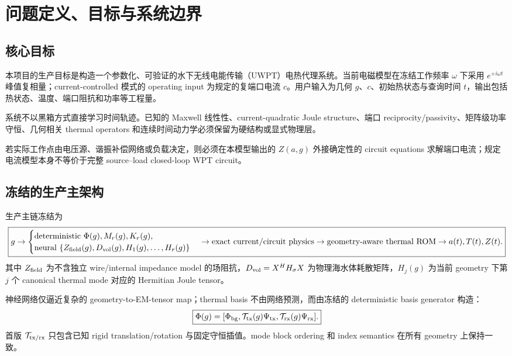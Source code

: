 \section{问题定义、目标与系统边界}

\subsection{核心目标}
本项目的生产目标是构造一个参数化、可验证的水下无线电能传输（UWPT）电热代理系统。当前电磁模型在冻结工作频率 $\omega$ 下采用 $e^{+i\omega t}$ 峰值复相量；current-controlled 模式的 operating input 为规定的复端口电流 $c$。用户输入为几何 $g$、$c$、初始热状态与查询时间 $t$，输出包括热状态、温度、端口阻抗和功率等工程量。

系统不以黑箱方式直接学习时间轨迹。已知的 Maxwell 线性性、current-quadratic Joule structure、端口 reciprocity/passivity、矩阵级功率守恒、几何相关 thermal operators 和连续时间动力学必须保留为硬结构或显式物理层。

若实际工作点由电压源、谐振补偿网络或负载决定，则必须在本模型输出的 $Z(a,g)$ 外接确定性的 circuit equations 求解端口电流；规定电流模型本身不等价于完整 source--load closed-loop WPT circuit。

\subsection{冻结的生产主架构}
生产主链冻结为
\begin{equation}
\boxed{
 g
 \rightarrow
 \begin{cases}
 \text{deterministic }\Phi(g),M_r(g),K_r(g),\\
 \text{neural }\{Z_{\rm field}(g),D_{\rm vol}(g),H_1(g),\ldots,H_r(g)\}
 \end{cases}
 \rightarrow \text{exact current/circuit physics}
 \rightarrow \text{geometry-aware thermal ROM}
 \rightarrow a(t),T(t),Z(t).
}
\end{equation}
其中 $Z_{\rm field}$ 为不含独立 wire/internal impedance model 的场阻抗，$D_{\rm vol}=X^HH_\sigma X$ 为物理海水体耗散矩阵，$H_j(g)$ 为当前 geometry 下第 $j$ 个 canonical thermal mode 对应的 Hermitian Joule tensor。

神经网络仅逼近复杂的 geometry-to-EM-tensor map；thermal basis 不由网络预测，而由冻结的 deterministic basis generator 构造：
\begin{equation}
\boxed{
\Phi(g)=
[\Phi_{\rm bg},\mathcal T_{\rm tx}(g)\Psi_{\rm tx},\mathcal T_{\rm rx}(g)\Psi_{\rm rx}].
}
\end{equation}
首版 $\mathcal T_{\rm tx/rx}$ 只包含已知 rigid translation/rotation 与固定守恒插值。mode block ordering 和 index semantics 在所有 geometry 上保持一致。

